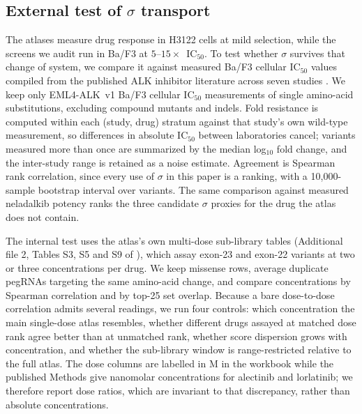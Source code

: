 \documentclass[11pt,a4paper]{article}
\begin{document}
\subsection{External test of \texorpdfstring{$\sigma$}{sigma} transport}
\label{sec:transport-methods}
The atlases measure drug response in H3122 cells at mild selection, while
the screens we audit run in Ba/F3 at $5$--$15\times$~IC$_{50}$. To test
whether $\sigma$ survives that change of system, we compare it against
measured Ba/F3 cellular IC$_{50}$ values compiled from the published ALK
inhibitor literature across seven studies
\citep{gainor2016,zhang2016,drilon2018,okada2019,mizuta2021,murray2021,lin2024}.
We keep only EML4-ALK~v1 Ba/F3 cellular IC$_{50}$ measurements of single
amino-acid substitutions, excluding compound mutants and indels. Fold
resistance is computed within each (study, drug) stratum against that
study's own wild-type measurement, so differences in absolute IC$_{50}$
between laboratories cancel; variants measured more than once are
summarized by the median log$_{10}$ fold change, and the inter-study
range is retained as a noise estimate. Agreement is Spearman rank
correlation, since every use of $\sigma$ in this paper is a ranking, with
a 10,000-sample bootstrap interval over variants. The same comparison
against measured neladalkib potency ranks the three candidate $\sigma$
proxies for the drug the atlas does not contain.

The internal test uses the atlas's own multi-dose sub-library tables
(Additional file 2, Tables S3, S5 and S9 of \citep{oh2026}), which
assay exon-23 and exon-22 variants at two or three concentrations per
drug. We keep missense rows, average duplicate pegRNAs targeting the
same amino-acid change, and compare concentrations by Spearman
correlation and by top-25 set overlap. Because a bare dose-to-dose
correlation admits several readings, we run four controls: which
concentration the main single-dose atlas resembles, whether different
drugs assayed at matched dose rank agree better than at unmatched rank,
whether score dispersion grows with concentration, and whether the
sub-library window is range-restricted relative to the full atlas. The
dose columns are labelled in \textmu M in the workbook while the
published Methods give nanomolar concentrations for alectinib and
lorlatinib; we therefore report dose ratios, which are invariant to
that discrepancy, rather than absolute concentrations.
\end{document}
